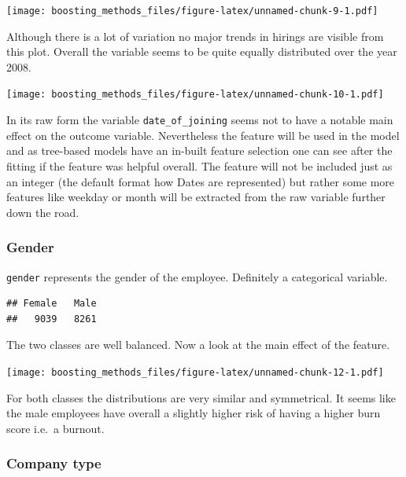 \documentclass[
]{book}
\newenvironment{Shaded}{\begin{snugshade}}{\end{snugshade}}
\newcommand{\CommentTok}[1]{\textcolor[rgb]{0.56,0.35,0.01}{\textit{#1}}}
\newcommand{\FunctionTok}[1]{\textcolor[rgb]{0.00,0.00,0.00}{#1}}
\newcommand{\NormalTok}[1]{#1}
\newcommand{\SpecialCharTok}[1]{\textcolor[rgb]{0.00,0.00,0.00}{#1}}
\begin{document}
\texttt{[image: boosting\_methods\_files/figure-latex/unnamed-chunk-9-1.pdf]}

Although there is a lot of variation no major trends in hirings are visible from this plot. Overall the variable seems to be quite equally distributed over the year 2008.

\texttt{[image: boosting\_methods\_files/figure-latex/unnamed-chunk-10-1.pdf]}

In its raw form the variable \texttt{date\_of\_joining} seems not to have a notable main effect on the outcome variable. Nevertheless the feature will be used in the model and as tree-based models have an in-built feature selection one can see after the fitting if the feature was helpful overall. The feature will not be included just as an integer (the default format how Dates are represented) but rather some more features like weekday or month will be extracted from the raw variable further down the road.

\hypertarget{gender}{%
\subsubsection{Gender}\label{gender}}

\texttt{gender} represents the gender of the employee. Definitely a categorical variable.

\begin{Shaded}
\end{Shaded}

\begin{verbatim}
## Female   Male 
##   9039   8261
\end{verbatim}

The two classes are well balanced. Now a look at the main effect of the feature.

\texttt{[image: boosting\_methods\_files/figure-latex/unnamed-chunk-12-1.pdf]}

For both classes the distributions are very similar and symmetrical. It seems like the male employees have overall a slightly higher risk of having a higher burn score i.e.~a burnout.

\hypertarget{company-type}{%
\subsubsection{Company type}\label{company-type}}
\end{document}
